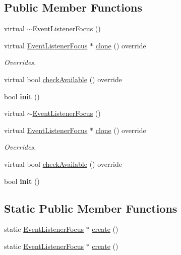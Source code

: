 \subsection*{Public Member Functions}
\begin{DoxyCompactItemize}
\item 
virtual \hyperlink{classEventListenerFocus_a3ef85d59f05e0ab6973c814ea83e16a6}{$\sim$\+Event\+Listener\+Focus} ()
\item 
\mbox{\label{classEventListenerFocus_a0c1533bf324759353479a453ac10981f}} 
virtual \hyperlink{classEventListenerFocus}{Event\+Listener\+Focus} $\ast$ \hyperlink{classEventListenerFocus_a0c1533bf324759353479a453ac10981f}{clone} () override
\begin{DoxyCompactList}\small\item\em Overrides. \end{DoxyCompactList}\item 
virtual bool \hyperlink{classEventListenerFocus_a103c10ed16e8ef1ddce0965d1e1c40c6}{check\+Available} () override
\item 
\mbox{\label{classEventListenerFocus_aa12ea9b268a89e016e09312fae2d07c5}} 
bool {\bfseries init} ()
\item 
virtual \hyperlink{classEventListenerFocus_ab0f45bad4adcf04f55d0b947656642f1}{$\sim$\+Event\+Listener\+Focus} ()
\item 
\mbox{\label{classEventListenerFocus_a947808a74abc88554f23668cebff1a7d}} 
virtual \hyperlink{classEventListenerFocus}{Event\+Listener\+Focus} $\ast$ \hyperlink{classEventListenerFocus_a947808a74abc88554f23668cebff1a7d}{clone} () override
\begin{DoxyCompactList}\small\item\em Overrides. \end{DoxyCompactList}\item 
virtual bool \hyperlink{classEventListenerFocus_acc03526a7e5478b87327f3e8c28ded12}{check\+Available} () override
\item 
\mbox{\label{classEventListenerFocus_aa12ea9b268a89e016e09312fae2d07c5}} 
bool {\bfseries init} ()
\end{DoxyCompactItemize}
\subsection*{Static Public Member Functions}
\begin{DoxyCompactItemize}
\item 
static \hyperlink{classEventListenerFocus}{Event\+Listener\+Focus} $\ast$ \hyperlink{classEventListenerFocus_a59fb63c7e692808b59c76e498afb026a}{create} ()
\item 
static \hyperlink{classEventListenerFocus}{Event\+Listener\+Focus} $\ast$ \hyperlink{classEventListenerFocus_a7f998e020c71c6885a587781f17a4236}{create} ()
\end{DoxyCompactItemize}
